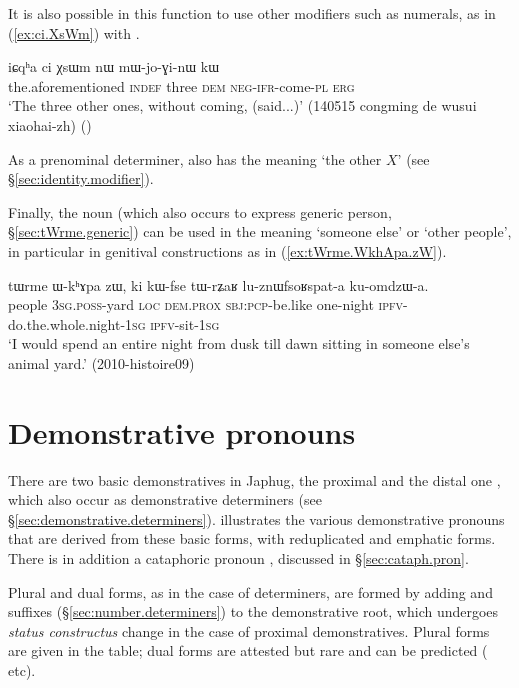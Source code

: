 It is also possible in this function to use other modifiers such as numerals, as in (\ref{ex:ci.XsWm}) with . 

 \begin{exe}
\ex \label{ex:ci.XsWm}
 \gll iɕqʰa ci χsɯm nɯ mɯ-jo-ɣi-nɯ kɯ  \\
 the.aforementioned \textsc{indef} three \textsc{dem} \textsc{neg}-\textsc{ifr}-come-\textsc{pl} \textsc{erg} \\
\glt `The three other ones, without coming, (said...)' (140515 congming de wusui xiaohai-zh)
()
 \end{exe}

As a prenominal determiner,  also has the meaning `the other $X$' (see §\ref{sec:identity.modifier}).


Finally, the noun  (which also occurs to express generic person, §\ref{sec:tWrme.generic}) can be used in the meaning `someone else' or `other people',  in particular in genitival constructions as in (\ref{ex:tWrme.WkhApa.zW}).

\begin{exe}
\ex \label{ex:tWrme.WkhApa.zW}
\gll tɯrme ɯ-kʰɤpa zɯ, ki kɯ-fse tɯ-rʑaʁ lu-znɯfsoʁspat-a ku-omdzɯ-a. \\
people \textsc{3sg}.\textsc{poss}-yard \textsc{loc} \textsc{dem}.\textsc{prox} \textsc{sbj}:\textsc{pcp}-be.like one-night \textsc{ipfv}-do.the.whole.night-\textsc{1sg} \textsc{ipfv}-sit-\textsc{1sg} \\
\glt `I would spend an entire night from dusk till dawn sitting in someone else's animal yard.' (2010-histoire09)
\end{exe} 

\section{Demonstrative pronouns} \label{sec:demonstrative.pronouns}
There are two basic demonstratives in Japhug, the proximal  and the distal one , which also occur as demonstrative determiners (see §\ref{sec:demonstrative.determiners}).  illustrates the various demonstrative pronouns that are derived from these basic forms, with reduplicated and emphatic forms. There is in addition a cataphoric pronoun , discussed in §\ref{sec:cataph.pron}.

Plural and dual forms, as in the case of determiners, are formed by adding  and  suffixes (§\ref{sec:number.determiners}) to the demonstrative root, which undergoes \textit{status constructus} change  \fl{}  in the case of proximal demonstratives. Plural forms are given in the table; dual forms are attested but rare and can be predicted ( etc).

